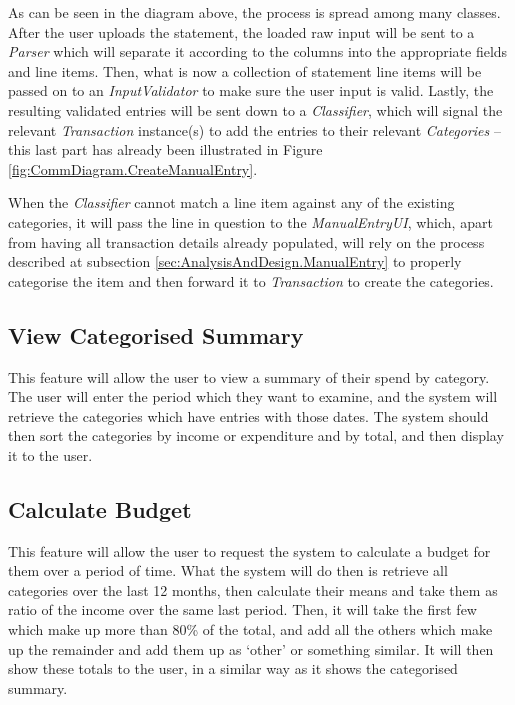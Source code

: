 As can be seen in the diagram above, the process is spread among many classes.
After the user uploads the statement, the loaded raw input will be sent to a
\emph{Parser} which will separate it according to the columns into the
appropriate fields and line items. Then, what is now a collection of statement
line items will be passed on to an \emph{InputValidator} to make sure the user
input is valid. Lastly, the resulting validated entries will be sent down to a
\emph{Classifier}, which will signal the relevant \emph{Transaction}
instance(s) to add the entries to their relevant \emph{Categories} -- this last
part has already been illustrated in Figure
\ref{fig:CommDiagram.CreateManualEntry}. 

When the \emph{Classifier} cannot match a line item against any of the existing
categories, it will pass the line in question to the \emph{ManualEntryUI},
which, apart from having all transaction details already populated, will rely
on the process described at subsection \ref{sec:AnalysisAndDesign.ManualEntry}
to properly categorise the item and then forward it to \emph{Transaction} to
create the categories.

\subsection{View Categorised Summary} \label{sec:AnalysisAndDesign.ViewSummary}
This feature will allow the user to view a summary of their spend by category.
The user will enter the period which they want to examine, and the system will
retrieve the categories which have entries with those dates. The system should
then sort the categories by income or expenditure and by total, and then
display it to the user.


\subsection{Calculate Budget} \label{sec:AnalysisAndDesign.CalculateBudget}
This feature will allow the user to request the system to calculate a budget
for them over a period of time. What the system will do then is retrieve all
categories over the last 12 months, then calculate their means and take them as
ratio of the income over the same last period. Then, it will take the first few
which make up more than 80\% of the total, and add all the others which make up
the remainder and add them up as `other' or something similar. It will then
show these totals to the user, in a similar way as it shows the categorised
summary.

